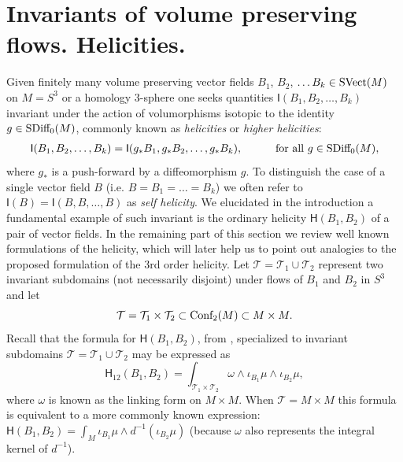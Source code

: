 \documentclass[12pt]{article}
\numberwithin{equation}{section}
\newcommand{\Cnf}{\text{\rm Conf}}
\newcommand{\no}{\noindent}
\begin{document}

\no \section{Invariants of volume preserving flows. Helicities.}\label{sec:invariants-flows}

Given finitely many  volume preserving vector fields $B_1$, $B_2$, $\ldots B_k\in \text{\rm SVect}(M)$  on $M=S^3$ or a homology 3-sphere one seeks quantities $\mathsf{I}(B_1,B_2,\ldots,B_k)$ invariant under the action of volumorphisms isotopic to the identity $g\in \text{\rm SDiff}_0(M)$, commonly known as \emph{helicities} or \emph{higher helicities}:
\begin{gather}\label{eq:invariants}
 \mathsf{I}(B_1,B_2,\ldots,B_k)=\mathsf{I}(g_\ast B_1,g_\ast B_2,\ldots,g_\ast B_k),\qquad\quad \text{for all }g\in \text{\rm SDiff}_0(M), 
\end{gather}
where $g_\ast$ is a push-forward by a diffeomorphism $g$. To distinguish the case of a single vector field $B$ (i.e. $B=B_1=\ldots=B_k$) we often refer to $\mathsf{I}(B)=\mathsf{I}(B,B,\ldots,B)$ as \emph{self helicity}. We elucidated in the introduction a fundamental example of such invariant is the ordinary helicity $\mathsf{H}(B_1,B_2)$ of a pair of vector fields. In the remaining part of this section we review 
well known formulations of the helicity, which will later help us to point out analogies to the 
proposed formulation of the 3rd order helicity. Let $\mathcal{T}=\mathcal{T}_1\cup \mathcal{T}_2$ represent two invariant subdomains (not necessarily disjoint) under flows of $B_1$ and $B_2$ in $S^3$ and let 
\[
 \mathcal{T}=\mathcal{T}_1\times\mathcal{T}_2\subset \Cnf_2(M)\subset M\times M.
\]
Recall that the formula for $\mathsf{H}(B_1,B_2)$, from \cite{Khesin05, Vogel03}, specialized to invariant subdomains $\mathcal{T}=\mathcal{T}_1\cup \mathcal{T}_2$ may be expressed as 
\begin{equation}\label{eq:helicity}
 \mathsf{H}_{12}(B_1,B_2)=\int_{\mathcal{T}_1\times\mathcal{T}_2} \omega\wedge\iota_{B_1}\mu\wedge\iota_{B_2}\mu,
\end{equation}
where $\omega$ is known as the linking form on $M\times M$. When $\mathcal{T}=M\times M$ this formula is equivalent to a more commonly known expression: $\mathsf{H}(B_1,B_2)=\int_M \iota_{B_1}\mu\wedge d^{-1}(\iota_{B_2}\mu)$ (because $\omega$ also represents the integral kernel of $d^{-1}$).
\end{document}
